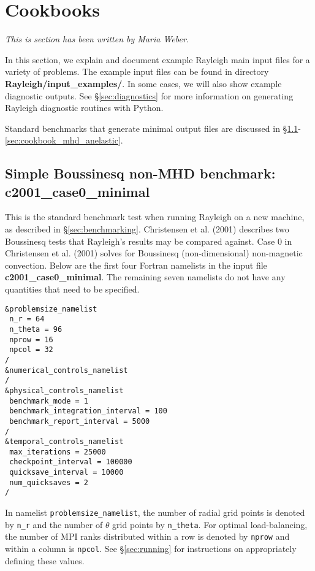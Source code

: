 \clearpage


\section{Cookbooks}\label{sec:cookbooks}
\emph{This is section has been written by Maria Weber.}

In this section, we explain and document example Rayleigh main input files for a variety of problems. The example input files can be found in directory \textbf{Rayleigh/input\_examples/}. In some cases, we will also show example diagnostic outputs. See \S \ref{sec:diagnostics} for more information on generating Rayleigh diagnostic routines with Python. 

Standard benchmarks that generate minimal output files are discussed in \S \ref{sec:cookbook_case0_minimal}-\ref{sec:cookbook_mhd_anelastic}. 


\subsection{Simple Boussinesq non-MHD benchmark: c2001\_case0\_minimal}\label{sec:cookbook_case0_minimal}

This is the standard benchmark test when running Rayleigh on a new machine, as described in \S \ref{sec:benchmarking}. Christensen et al. (2001) describes two Boussinesq tests that Rayleigh's results may be compared against. Case 0 in Christensen et al. (2001) solves for Boussinesq (non-dimensional) non-magnetic convection. Below are the first four Fortran namelists in the input file \textbf{c2001\_case0\_minimal}. The remaining seven namelists do not have any quantities that need to be specified. 
    
\begin{lstlisting}
&problemsize_namelist
 n_r = 64
 n_theta = 96
 nprow = 16
 npcol = 32
/
&numerical_controls_namelist
/
&physical_controls_namelist
 benchmark_mode = 1
 benchmark_integration_interval = 100
 benchmark_report_interval = 5000
/
&temporal_controls_namelist
 max_iterations = 25000
 checkpoint_interval = 100000
 quicksave_interval = 10000
 num_quicksaves = 2
/
\end{lstlisting}    

In namelist \texttt{problemsize\_namelist}, the number of radial grid points is denoted by \texttt{n\_r} and the number of $\theta$ grid points by \texttt{n\_theta}. For optimal load-balancing, the number of MPI ranks distributed within a row is denoted by \texttt{nprow} and within a column is \texttt{npcol}. See \S \ref{sec:running} for instructions on appropriately defining these values.

